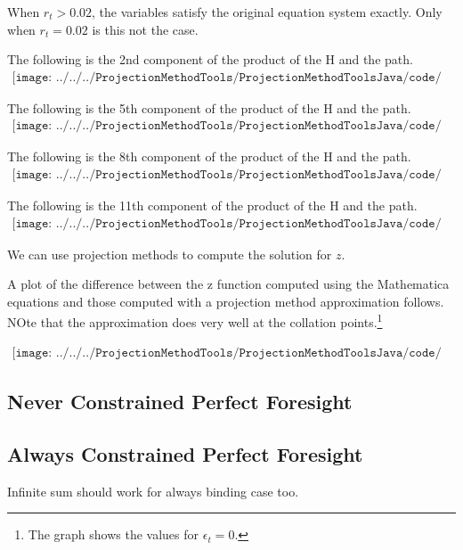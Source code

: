 \documentclass[12pt]{article}
\begin{document}
When $r_t>0.02$, the variables satisfy the original equation system exactly.
Only when $r_t=0.02$ is this not the case.


The following is the 2nd component of the product of the H and the path.
\begin{gather*}
\texttt{[image: ../../../ProjectionMethodTools/ProjectionMethodToolsJava/code/prettyhapp04A.pdf]}
\end{gather*}

The following is the 5th component of the product of the H and the path.
\begin{gather*}
\texttt{[image: ../../../ProjectionMethodTools/ProjectionMethodToolsJava/code/prettyhapp04B.pdf]}
\end{gather*}

The following is the 8th component of the product of the H and the path.
\begin{gather*}
\texttt{[image: ../../../ProjectionMethodTools/ProjectionMethodToolsJava/code/prettyhapp04C.pdf]}
\end{gather*}


The following is the 11th component of the product of the H and the path.
\begin{gather*}
\texttt{[image: ../../../ProjectionMethodTools/ProjectionMethodToolsJava/code/prettyhapp04D.pdf]}
\end{gather*}


We can use projection methods to compute the solution for $z$.

A plot of the difference between the z function computed using the Mathematica equations and those computed with a projection method approximation follows. NOte that the approximation does very well at the collation points.\footnote{The graph shows the values for $\epsilon_t=0$.}


\begin{gather*}
\texttt{[image: ../../../ProjectionMethodTools/ProjectionMethodToolsJava/code/prettyNumDiff04.pdf]}
\end{gather*}







\subsection{Never Constrained Perfect Foresight}
\label{sec:never-constr-perf}

\subsection{Always Constrained Perfect Foresight}
\label{sec:never-constr-perf}
Infinite sum should work for always binding case too.
\end{document}
